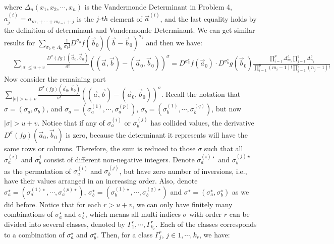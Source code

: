 \documentclass[12pt]{article}
\begin{document}
where $\Delta_{n}(x_{1},x_{2},\cdots,x_{n})$ is the Vandermonde Determinant in Problem 4, $a_{j}^{(i)}=a_{m_{1}+\cdots+m_{i-1}+j}$ is the $j$-$th$ element of $\vec{a}^{(i)}$, and the last equality holds by the definition of determinant and Vandermonde Determinant. We can get similar results for $\sum_{\sigma_{b}\in\Lambda_{b}}\frac{1}{\sigma_{b}!}D^{\sigma_{b}}f(\vec{b}_{0})(\vec{b}-\vec{b}_{0})^{\sigma_{b}}$ and then we have:
\begin{align*}
	&\sum_{|\sigma|\leqslant u+v}\frac{D^{\sigma}(fg)(\vec{a}_{0},\vec{b}_{0})}{\sigma!}((\vec{a},\vec{b})-(\vec{a}_{0},\vec{b}_{0}))^{\sigma}=D^{\sigma_{a}^{\star}}f(\vec{a}_{0})\cdot D^{\sigma_{b}^{\star}}g(\vec{b}_{0})\frac{\prod_{i=1}^{p}\Delta_{m_{i}}^{a}\prod_{j=1}^{q}\Delta_{n_{j}}^{b}}{\prod_{i=1}^{p}(m_{i}-1)!\prod_{j=1}^{q}(n_{j}-1)!}
\end{align*}
Now consider the remaining part $\sum_{|\sigma|> u+v}\frac{D^{\sigma}(fg)(\vec{a}_{0},\vec{b}_{0})}{\sigma!}((\vec{a},\vec{b})-(\vec{a}_{0},\vec{b}_{0}))^{\sigma}$. Recall the notation that $\sigma=(\sigma_{a},\sigma_{b})$, and $\sigma_{a}=(\sigma^{(1)}_{a},\cdots,\sigma^{(p)}_{a})$, $\sigma_{b}=(\sigma^{(1)}_{b},\cdots,\sigma^{(q)}_{b})$, but now $|\sigma|>u+v$. Notice that if any of $\sigma_{a}^{(i)}$ or $\sigma_{b}^{(j)}$ has collided values, the derivative $D^{\sigma}(fg)(\vec{a}_{0},\vec{b}_{0})$ is zero, because the determinant it represents will have the same rows or columns. Therefore, the sum is reduced to those $\sigma$ such that all $\sigma_{a}^{(i)}$ and $\sigma_{b}^{j}$ consist of different non-negative integers. Denote $\sigma_{a}^{(i)\star}$ and $\sigma_{b}^{(j)\star}$ as the permutation of $\sigma_{a}^{(i)}$ and $\sigma_{b}^{(j)}$, but have zero number of inversions, i.e., have their values arranged in an increasing order. Also, denote $\sigma_{a}^{\star}=(\sigma_{a}^{(1)\star},\cdots,\sigma_{a}^{(p)\star})$, $\sigma_{b}^{\star}=(\sigma_{b}^{(1)\star},\cdots,\sigma_{b}^{(q)\star})$ and $\sigma^{\star}=(\sigma^{\star}_{a},\sigma_{b}^{\star})$ as we did before. Notice that for each $r>u+v$, we can only have finitely many combinations of $\sigma_{a}^{\star}$ and $\sigma_{b}^{\star}$, which means all multi-indices $\sigma$ with order $r$ can be divided into several classes, denoted by $\Gamma_{1}^{r},\cdots,\Gamma_{k_{r}}^{r}$. Each of the classes corresponds to a combination of $\sigma_{a}^{\star}$ and $\sigma_{b}^{\star}$. Then, for a class $\Gamma_{j}^{r}$, $j\in 1,\cdots,k_{r}$, we have:
\end{document}
